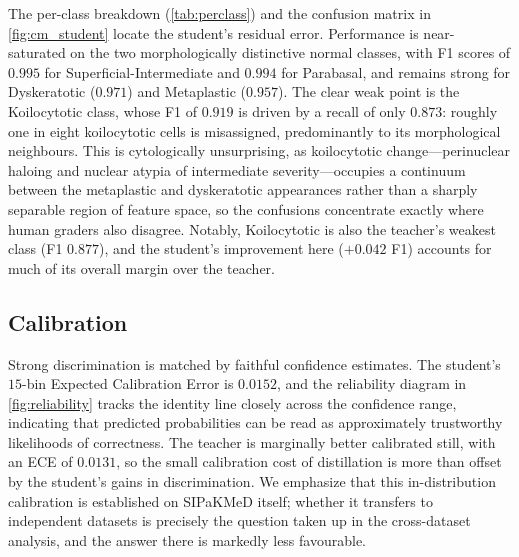 The per-class breakdown (\ref{tab:perclass}) and the confusion matrix in \ref{fig:cm_student} locate the student's residual error. Performance is near-saturated on the two morphologically distinctive normal classes, with F1 scores of $0.995$ for Superficial-Intermediate and $0.994$ for Parabasal, and remains strong for Dyskeratotic ($0.971$) and Metaplastic ($0.957$). The clear weak point is the Koilocytotic class, whose F1 of $0.919$ is driven by a recall of only $0.873$: roughly one in eight koilocytotic cells is misassigned, predominantly to its morphological neighbours. This is cytologically unsurprising, as koilocytotic change---perinuclear haloing and nuclear atypia of intermediate severity---occupies a continuum between the metaplastic and dyskeratotic appearances rather than a sharply separable region of feature space, so the confusions concentrate exactly where human graders also disagree. Notably, Koilocytotic is also the teacher's weakest class (F1 $0.877$), and the student's improvement here ($+0.042$ F1) accounts for much of its overall margin over the teacher.

\subsection{Calibration}

Strong discrimination is matched by faithful confidence estimates. The student's $15$-bin Expected Calibration Error is $0.0152$, and the reliability diagram in \ref{fig:reliability} tracks the identity line closely across the confidence range, indicating that predicted probabilities can be read as approximately trustworthy likelihoods of correctness. The teacher is marginally better calibrated still, with an ECE of $0.0131$, so the small calibration cost of distillation is more than offset by the student's gains in discrimination. We emphasize that this in-distribution calibration is established on SIPaKMeD itself; whether it transfers to independent datasets is precisely the question taken up in the cross-dataset analysis, and the answer there is markedly less favourable.